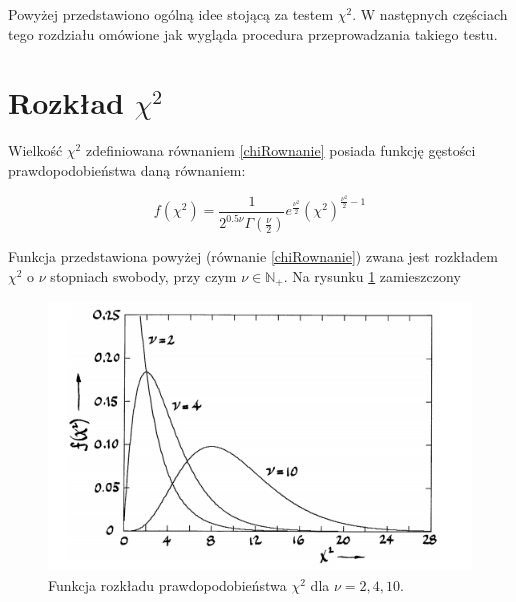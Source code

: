 Powyżej przedstawiono ogólną idee stojącą za testem $\chi^2$. W następnych częściach tego rozdziału omówione jak wygląda procedura przeprowadzania takiego testu.

\section{Rozkład $\chi^2$}

Wielkość  $\chi^2$ zdefiniowana równaniem \ref{chiRownanie} posiada funkcję gęstości prawdopodobieństwa daną równaniem: 

\begin{equation}
f(\chi^2)=\frac{1}{2^{0.5 \nu} \Gamma(\frac{\nu}{2})}e^{\frac{\nu^2}{2}} \left( \chi^2 \right)^{\frac{\nu^2}{2}-1}
\label{chi2Dis}
\end{equation}

Funkcja przedstawiona powyżej (równanie \ref{chiRownanie}) zwana jest rozkładem  $\chi^2$  o $\nu$ stopniach swobody, przy czym $\nu \in \mathbb{N}_{+}$. Na rysunku \ref{fig:chi2} zamieszczony 

\begin{figure}[h]
  \centering
  \includegraphics[scale=0.7]{rozdzial5/chi2.png}
  \caption{Funkcja rozkładu prawdopodobieństwa $\chi^2$  dla $\nu=2,4,10$.}
  \label{fig:chi2}
\end{figure}